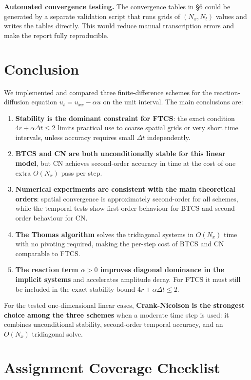 \documentclass[11pt,a4paper]{article}
\begin{document}
\textbf{Automated convergence testing.} The convergence tables in §6 could be generated by a separate validation script that runs grids of $(N_x,N_t)$ values and writes the tables directly. This would reduce manual transcription errors and make the report fully reproducible.

\section{Conclusion}

We implemented and compared three finite-difference schemes for the reaction-diffusion equation $u_t = u_{xx} - \alpha u$ on the unit interval. The main conclusions are:

\begin{enumerate}
\item \textbf{Stability is the dominant constraint for FTCS}: the exact condition $4r+\alpha\Delta t\le 2$ limits practical use to coarse spatial grids or very short time intervals, unless accuracy requires small $\Delta t$ independently.
\item \textbf{BTCS and CN are both unconditionally stable for this linear model}, but CN achieves second-order accuracy in time at the cost of one extra $O(N_x)$ pass per step.
\item \textbf{Numerical experiments are consistent with the main theoretical orders}: spatial convergence is approximately second-order for all schemes, while the temporal tests show first-order behaviour for BTCS and second-order behaviour for CN.
\item \textbf{The Thomas algorithm} solves the tridiagonal systems in $O(N_x)$ time with no pivoting required, making the per-step cost of BTCS and CN comparable to FTCS.
\item \textbf{The reaction term $\alpha > 0$ improves diagonal dominance in the implicit systems} and accelerates amplitude decay. For FTCS it must still be included in the exact stability bound $4r+\alpha\Delta t\le 2$.
\end{enumerate}

For the tested one-dimensional linear cases, \textbf{Crank-Nicolson is the strongest choice among the three schemes} when a moderate time step is used: it combines unconditional stability, second-order temporal accuracy, and an $O(N_x)$ tridiagonal solve.

\section{Assignment Coverage Checklist}
\end{document}
